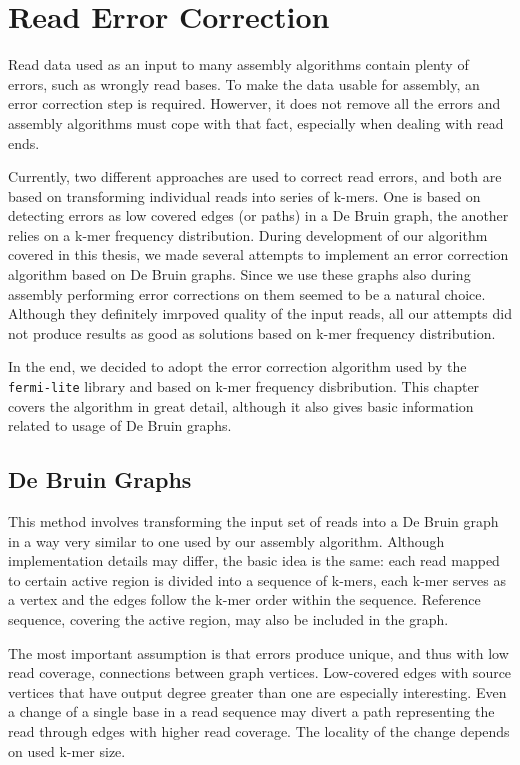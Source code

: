 \chapter{Read Error Correction}
\label{chap:read-error-correction}

Read data used as an input to many assembly algorithms contain plenty of errors, such as wrongly read bases. To make the data usable for assembly, an error correction step is required. Howerver, it does not remove all the errors and assembly algorithms must cope with that fact, especially when dealing with read ends.

Currently, two different approaches are used to correct read errors, and both are based on transforming individual reads into series of k-mers. One is based on detecting errors as low covered edges (or paths) in a De Bruin graph, the another relies on a k-mer frequency distribution. During development of our algorithm covered in this thesis, we made several attempts to implement an error correction algorithm based on De Bruin graphs. Since we use these graphs also during assembly performing error corrections on them seemed to be a natural choice. Although they definitely imrpoved quality of the input reads, all our attempts did not produce results as good as solutions based on k-mer frequency distribution.

In the end, we decided to adopt the error correction algorithm used by the \texttt{fermi-lite} library and based on k-mer frequency disbribution. This chapter covers the algorithm in great detail, although it also gives basic information related to usage of De Bruin graphs.

\section{De Bruin Graphs}
\label{sec:ec-de-bruin-graphs}

This method involves transforming the input set of reads into a De Bruin graph in a way very similar to one used by our assembly algorithm. Although implementation details may differ, the basic idea is the same: each read mapped to certain active region is divided into a sequence of k-mers, each k-mer serves as a vertex and the edges follow the k-mer order within the sequence. Reference sequence, covering the active region, may also be included in the graph.

The most important assumption is that errors produce unique, and thus with low read coverage, connections between graph vertices. Low-covered edges with source vertices that have output degree greater than one are especially interesting. Even a change of a single base in a read sequence may divert a path representing the read through edges with higher read coverage. The locality of the change depends on used k-mer size.

